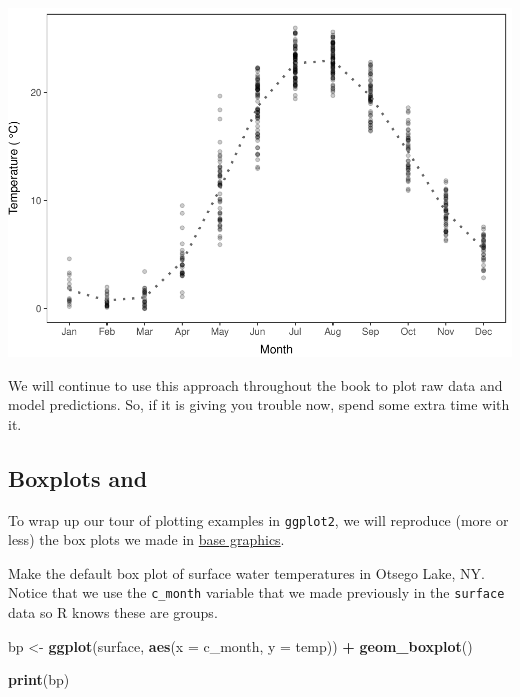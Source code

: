 \documentclass[
]{book}
\newenvironment{Shaded}{\begin{snugshade}}{\end{snugshade}}
\newcommand{\DataTypeTok}[1]{\textcolor[rgb]{0.13,0.29,0.53}{#1}}
\newcommand{\KeywordTok}[1]{\textcolor[rgb]{0.13,0.29,0.53}{\textbf{#1}}}
\newcommand{\NormalTok}[1]{#1}
\newcommand{\OperatorTok}[1]{\textcolor[rgb]{0.81,0.36,0.00}{\textbf{#1}}}
\newcommand{\StringTok}[1]{\textcolor[rgb]{0.31,0.60,0.02}{#1}}
\begin{document}
\includegraphics{worstr_files/figure-latex/unnamed-chunk-111-1.pdf}

We will continue to use this approach throughout the book to plot raw data and model predictions. So, if it is giving you trouble now, spend some extra time with it.

\hypertarget{ggboxplots}{%
\subsection{Boxplots and}\label{ggboxplots}}

To wrap up our tour of plotting examples in \texttt{ggplot2}, we will reproduce (more or less) the box plots we made in \protect\hyperlink{boxplots}{base graphics}.

Make the default box plot of surface water temperatures in Otsego Lake, NY. Notice that we use the \texttt{c\_month} variable that we made previously in the \texttt{surface} data so R knows these are groups.

\begin{Shaded}
\begin{Highlighting}[]
\NormalTok{bp <-}\StringTok{ }\KeywordTok{ggplot}\NormalTok{(surface, }\KeywordTok{aes}\NormalTok{(}\DataTypeTok{x =}\NormalTok{ c_month, }\DataTypeTok{y =}\NormalTok{ temp)) }\OperatorTok{+}\StringTok{ }\KeywordTok{geom_boxplot}\NormalTok{()}

\KeywordTok{print}\NormalTok{(bp)}
\end{Highlighting}
\end{Shaded}
\end{document}
